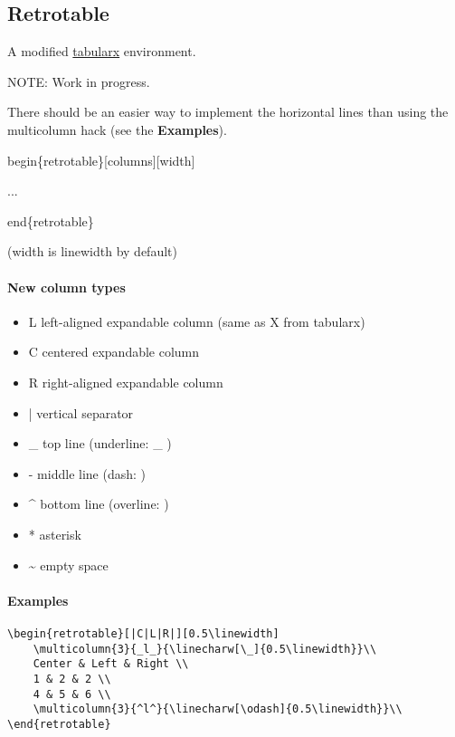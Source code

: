 \documentclass[english,12pt,openany,letterpaper]{book}
\begin{document}
\break


\subsection{Retrotable}

A modified \href{https://www.ctan.org/pkg/tabularx}{tabularx} environment.

\begin{tabbox}[4][4]
	\begin{headerbox}{NOTE:}
		Work in progress.
		
		There should be an easier way to implement the horizontal lines than using the \bs multicolumn hack (see the \textbf{Examples}).
	\end{headerbox}
\end{tabbox}

\bs begin\{retrotable\}[columns][width]

\tab ...

\bs end\{retrotable\}

(width is \bs linewidth by default)

\skipline

\paragraph{New column types}

\begin{itemize}
	\item L left-aligned expandable column (same as X from tabularx)
	\item C centered expandable column
	\item R right-aligned expandable column
	\item | vertical separator
	\item \_ top line (underline: \_ )
	\item - middle line (dash: \dash{} )
	\item \^{} bottom line (overline: \ol{~} )
	\item * asterisk
	\item \~{} empty space
\end{itemize}

\break

\paragraph{Examples}

\begin{verbatim}
\begin{retrotable}[|C|L|R|][0.5\linewidth]
    \multicolumn{3}{_l_}{\linecharw[\_]{0.5\linewidth}}\\
    Center & Left & Right \\
    1 & 2 & 2 \\
    4 & 5 & 6 \\
    \multicolumn{3}{^l^}{\linecharw[\odash]{0.5\linewidth}}\\
\end{retrotable}
\end{verbatim}
\end{document}
